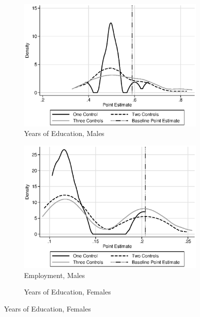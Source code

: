 \begin{figure}
\centering
\caption{Sensitivity to Choice of Control Set, Treatment vs. Next Best}\label{fig:senstnb}
\begin{subfigure}[h]{0.4\textwidth}
		\centering
		\caption{Years of Education, Males}
		\includegraphics[width=\textwidth]{output/sencontrols_male_years_30y_itt_wctrl.eps}
\end{subfigure}%
\begin{subfigure}[h]{0.4\textwidth}
	\centering
	\caption{Employment, Males}
		\includegraphics[width=\textwidth]{output/sencontrols_male_si30y_works_itt_wctrl.eps}
\end{subfigure}
\begin{subfigure}[h]{0.4\textwidth}
		\centering
		\caption{Years of Education, Females}

\end{subfigure}
\end{figure}
